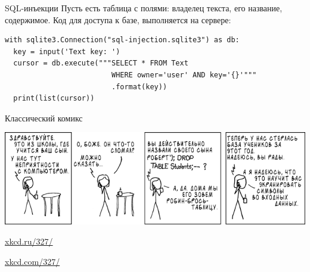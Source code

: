 \begin{frame}[t,fragile]{SQL-инъекции}
	Пусть есть таблица с полями: владелец текста, его название, содержимое.
	Код для доступа к базе, выполняется на сервере:
\begin{verbatim}
with sqlite3.Connection("sql-injection.sqlite3") as db:
  key = input('Text key: ')
  cursor = db.execute("""SELECT * FROM Text
                         WHERE owner='user' AND key='{}'"""
                         .format(key))
  print(list(cursor))
\end{verbatim}
\end{frame}

\begin{frame}{Классический комикс}
	\begin{center}
		\includegraphics[scale=0.5]{xkcd-327.png}

		\href{https://xkcd.ru/327/}{xkcd.ru/327/}

		\href{https://xkcd.com/327/}{xkcd.com/327/}
	\end{center}
\end{frame}


